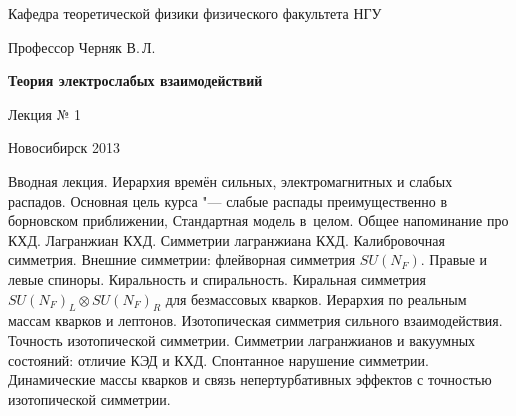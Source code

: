 \documentclass[12pt,pagesize,paper=landscape,paper=192mm:108mm]{scrbook}
\begin{document}
\begin{titlepage}
\begin{center}
    Кафедра теоретической физики физического факультета НГУ
    \medskip

    \Large
    Профессор Черняк В.\,Л.
    \bigskip

    \huge
    \textbf{Теория электрослабых взаимодействий}
    \bigskip

    \Large
    Лекция № 1
    \vfill

    \vfill

\normalsize    Новосибирск 2013
  \smallskip

  \ccbysa
  \end{center}
\end{titlepage}
\newpage

\vspace*{-1em}
\begin{center}
 \vfill
  \begin{minipage}{0.66\linewidth}
    Вводная лекция. Иерархия времён сильных, электромагнитных и слабых
    распадов. Основная цель курса "--- слабые распады преимущественно в
    борновском приближении, Стандартная модель в~целом.  Общее
    напоминание про КХД. Лагранжиан КХД. Симметрии лагранжиана
    КХД. Калибровочная симметрия. Внешние симметрии: флейворная
    симметрия $SU(N_F)$. Правые и левые
    спиноры.  Киральность и спиральность. Киральная симметрия
    $SU(N_F)_L\otimes SU(N_F)_R$ для
    безмассовых кварков.  Иерархия по реальным массам кварков и
    лептонов. Изотопическая симметрия сильного взаимодействия.
    Точность изотопической симметрии. Симметрии лагранжианов и
    вакуумных состояний: отличие КЭД и КХД.  Спонтанное нарушение
    симметрии. Динамические массы кварков и связь непертурбативных
    эффектов с точностью изотопической симметрии.
  \end{minipage}
  \vfill

\end{center}
\end{document}
